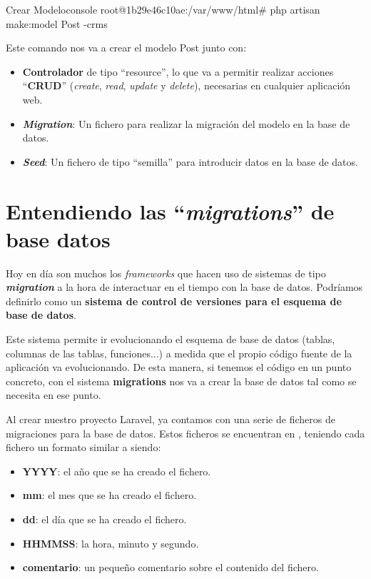\begin{mycode}{Crear Modelo}{console}{}
root@1b29e46c10ae:/var/www/html# php artisan make:model Post -crms
\end{mycode}

Este comando nos va a crear el modelo Post junto con:
\begin{itemize}
    \item \textbf{Controlador} de tipo “resource”, lo que va a permitir realizar acciones “\textbf{CRUD}” (\textit{create}, \textit{read}, \textit{update} y \textit{delete}), necesarias en cualquier aplicación web.
    \item \textbf{\textit{Migration}}: Un fichero para realizar la migración del modelo en la base de datos.
    \item \textbf{\textit{Seed}}: Un fichero de tipo “semilla” para introducir datos en la base de datos.
\end{itemize}

\chapter{Entendiendo las “\textit{migrations}” de base datos}

Hoy en día son muchos los \textit{frameworks} que hacen uso de sistemas de tipo \textbf{\textit{migration}} a la hora de interactuar en el tiempo con la base de datos. Podríamos definirlo como un \textbf{sistema de control de versiones para el esquema de base de datos}.

Este sistema permite ir evolucionando el esquema de base de datos (tablas, columnas de las tablas, funciones...) a medida que el propio código fuente de la aplicación va evolucionando. De esta manera, si tenemos el código en un punto concreto, con el sistema \textbf{migrations} nos va a crear la base de datos tal como se necesita en ese punto.

Al crear nuestro proyecto Laravel, ya contamos con una serie de ficheros de migraciones para la base de datos. Estos ficheros se encuentran en , teniendo cada fichero un formato similar a  siendo:

\begin{itemize}
    \item \textbf{YYYY}: el año que se ha creado el fichero.
    \item \textbf{mm}: el mes que se ha creado el fichero.
    \item \textbf{dd}: el día que se ha creado el fichero.
    \item \textbf{HHMMSS}: la hora, minuto y segundo.
    \item \textbf{comentario}: un pequeño comentario sobre el contenido del fichero.
\end{itemize}

